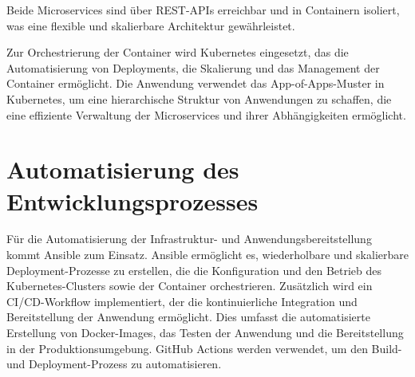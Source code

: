 Beide Microservices sind über REST-APIs erreichbar und in Containern isoliert, was eine flexible und skalierbare Architektur gewährleistet.


Zur Orchestrierung der Container wird Kubernetes eingesetzt, das die Automatisierung von Deployments, die Skalierung und das Management der Container ermöglicht. Die Anwendung verwendet das App-of-Apps-Muster in Kubernetes, um eine hierarchische Struktur von Anwendungen zu schaffen, die eine effiziente Verwaltung der Microservices und ihrer Abhängigkeiten ermöglicht.

\section{Automatisierung des Entwicklungsprozesses}
Für die Automatisierung der Infrastruktur- und Anwendungsbereitstellung kommt Ansible zum Einsatz. Ansible ermöglicht es, wiederholbare und skalierbare Deployment-Prozesse zu erstellen, die die Konfiguration und den Betrieb des Kubernetes-Clusters sowie der Container orchestrieren.
Zusätzlich wird ein CI/CD-Workflow implementiert, der die kontinuierliche Integration und Bereitstellung der Anwendung ermöglicht. Dies umfasst die automatisierte Erstellung von Docker-Images, das Testen der Anwendung und die Bereitstellung in der Produktionsumgebung. GitHub Actions werden verwendet, um den Build- und Deployment-Prozess zu automatisieren.